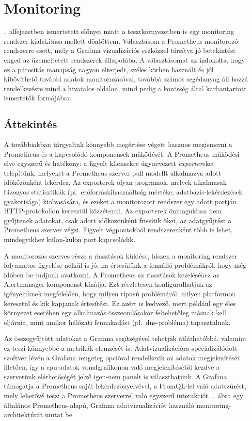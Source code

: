 
\chapter{Monitoring}
.~alfejezetben ismertetett előnyei miatt a tesztkörnyezetben is egy monitoring rendszer kialakítása mellett döntöttem. Választásom a Prometheus monitorozó rendszerre esett, mely a Grafana vizualizációs eszközzel társítva jó betekintést enged az üzemeltetett rendszerek állapotába. A választásomat az indokolta, hogy ez a párosítás manapság nagyon elterjedt, széles körben használt és jól kibővíthető további adatok monitorozásával, továbbá számos segédanyag áll hozzá rendelkezésre mind a hivatalos oldalon, mind pedig a közösség által karbantartott ismertetők formájában.

\section{Áttekintés}
A továbbiakban tárgyaltak könnyebb megértése végett hasznos megismerni a Prometheus és a kapcsolódó komponensek működését. A Prometheus működési elve egyszerű és hatékony: a figyelt kliensekre úgynevezett \textit{exporter}eket telepítünk, melyeket a Prometheus szerver pull modellt alkalmazva adott időközönként lekérdez. Az exporterek olyan programok, melyek alkalmasak bizonyos statisztikák (pl.~erőforráskihasználtság mértéke, adatbázis-lekérdezések gyakorisága) kiolvasására, és ezeket a monitorozott rendszer egy adott portján HTTP-protokollon keresztül közzétenni. Az exporterek önmagukban nem gyűjtenek adatokat, csak adott időközönként frissítik őket, az adatgyűjtést a Prometheus szerver végzi. Figyelt végpontokból rendszerenként több is lehet, mindegyikhez külön-külön port kapcsolódik.

A monitorozás szerves része a riasztások küldése, hiszen a monitoring rendszer folyamatos figyelése nélkül is jó, ha értesülünk a fennálló problémákról, hogy még időben be tudjunk avatkozni. A Prometheus az riasztások kezeléséhez az Alertmanager komponenst kínálja. Ezt részletesen konfigurálhatjuk az igényeinknek megfelelően, hogy milyen típusú problémáról, milyen platformon keresztül és kik kapjanak értesítést. Ez azért is kedvező, mert például egy éles környezet esetében egy alkalmazás összeomlásakor feltehetőleg másnak kell eljárnia, mint amikor hálózati fennakadást (pl.~\acrshort{dns}-probléma) tapasztalunk.

Az összegyűjtött adatokat a Grafana segítségével tehetjük átláthatóbbá, valamint ez teszi könnyebbé a metrikák elemzését is. Adatvizualizációra specializálódott szoftver lévén a Grafana rengeteg opcióval rendelkezik az adatok megjelenítését illetően, így a \acrshort{cpu}-adatok vonalgrafikonon való megjelenítésétől kezdve a szerverünk elérhetőségét jelző igen-nem panelt is választhatunk.
A Grafana támogatja a Prometheus saját lekérdezőnyelvével, a PromQL-lel való adatszűrést, mely lehetővé teszi a Prometheus szerverrel való egyszerű interakciót.
.~ábra egy általános Prometheus-alapú, Grafana adatvizualizációt használó monitoring-architektúrát mutat be.

